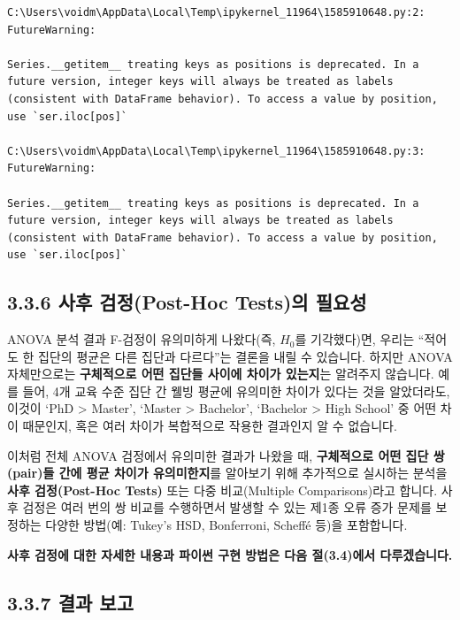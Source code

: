 \documentclass[
  letterpaper,
]{book}
\begin{document}
\begin{verbatim}
C:\Users\voidm\AppData\Local\Temp\ipykernel_11964\1585910648.py:2: FutureWarning:

Series.__getitem__ treating keys as positions is deprecated. In a future version, integer keys will always be treated as labels (consistent with DataFrame behavior). To access a value by position, use `ser.iloc[pos]`

C:\Users\voidm\AppData\Local\Temp\ipykernel_11964\1585910648.py:3: FutureWarning:

Series.__getitem__ treating keys as positions is deprecated. In a future version, integer keys will always be treated as labels (consistent with DataFrame behavior). To access a value by position, use `ser.iloc[pos]`
\end{verbatim}

\subsection{3.3.6 사후 검정(Post-Hoc Tests)의
필요성}\label{uxc0acuxd6c4-uxac80uxc815post-hoc-testsuxc758-uxd544uxc694uxc131}

ANOVA 분석 결과 F-검정이 유의미하게 나왔다(즉, \(H_0\)를 기각했다)면,
우리는 ``적어도 한 집단의 평균은 다른 집단과 다르다''는 결론을 내릴 수
있습니다. 하지만 ANOVA 자체만으로는 \textbf{구체적으로 어떤 집단들
사이에 차이가 있는지}는 알려주지 않습니다. 예를 들어, 4개 교육 수준 집단
간 웰빙 평균에 유의미한 차이가 있다는 것을 알았더라도, 이것이 `PhD
\textgreater{} Master', `Master \textgreater{} Bachelor', `Bachelor
\textgreater{} High School' 중 어떤 차이 때문인지, 혹은 여러 차이가
복합적으로 작용한 결과인지 알 수 없습니다.

이처럼 전체 ANOVA 검정에서 유의미한 결과가 나왔을 때, \textbf{구체적으로
어떤 집단 쌍(pair)들 간에 평균 차이가 유의미한지}를 알아보기 위해
추가적으로 실시하는 분석을 \textbf{사후 검정(Post-Hoc Tests)} 또는 다중
비교(Multiple Comparisons)라고 합니다. 사후 검정은 여러 번의 쌍 비교를
수행하면서 발생할 수 있는 제1종 오류 증가 문제를 보정하는 다양한
방법(예: Tukey's HSD, Bonferroni, Scheffé 등)을 포함합니다.

\textbf{사후 검정에 대한 자세한 내용과 파이썬 구현 방법은 다음
절(3.4)에서 다루겠습니다.}

\subsection{3.3.7 결과 보고}\label{uxacb0uxacfc-uxbcf4uxace0-2}
\end{document}

